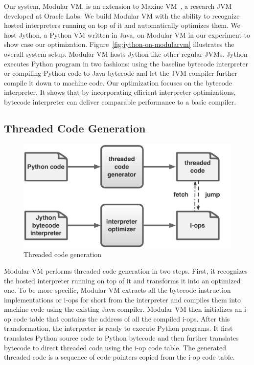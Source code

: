 Our system, Modular VM, is an extension to Maxine VM~\cite{Wimmer2013}, a research JVM developed at Oracle Labs.
We build Modular VM with the ability to recognize hosted interpreters running on top of it and automatically optimizes them.
We host Jython, a Python VM written in Java, on Modular VM in our experiment to show case our optimization.
Figure~\ref{fig:jython-on-modularvm} illustrates the overall system setup.
Modular VM hosts Jython like other regular JVMs.
Jython executes Python program in two fashions: using the baseline bytecode interpreter or
compiling Python code to Java bytecode and let the JVM compiler further compile it down to machine code.
Our optimization focuses on the bytecode interpreter.
It shows that by incorporating efficient interpreter optimizations, bytecode interpreter can deliver comparable performance to a basic compiler.

\subsection{Threaded Code Generation}

\begin{figure}[!h]
\centering
\includegraphics[scale=.5]{figures/ch2-direct-threading-on-modularvm.pdf}
\caption{Threaded code generation}
\label{fig:direct-threading-on-modularvm}
\end{figure}

Modular VM performs threaded code generation in two steps.
First, it recognizes the hosted interpreter running on top of it and transforms it into an optimized one.
To be more specific, Modular VM extracts all the bytecode instruction implementations or i-ops for short from the interpreter and
compiles them into machine code using the existing Java compiler.
Modular VM then initializes an i-op code table that contains the address of all the compiled i-ops.
After this transformation, the interpreter is ready to execute Python programs.
It first translates Python source code to Python bytecode and then further translates bytecode to direct threaded code using the i-op code table.
The generated threaded code is a sequence of code pointers copied from the i-op code table.

